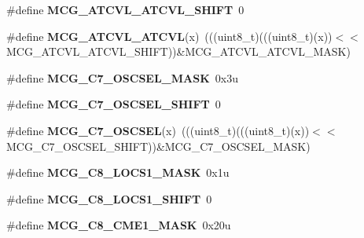 \begin{DoxyCompactItemize}
\item 
\#define {\bfseries M\+C\+G\+\_\+\+A\+T\+C\+V\+L\+\_\+\+A\+T\+C\+V\+L\+\_\+\+S\+H\+I\+FT}~0\hypertarget{group__MCG__Register__Masks_ga9e3e0eab24aaf1bf2905ae0cf4803eb3}{}\label{group__MCG__Register__Masks_ga9e3e0eab24aaf1bf2905ae0cf4803eb3}

\item 
\#define {\bfseries M\+C\+G\+\_\+\+A\+T\+C\+V\+L\+\_\+\+A\+T\+C\+VL}(x)~(((uint8\+\_\+t)(((uint8\+\_\+t)(x))$<$$<$M\+C\+G\+\_\+\+A\+T\+C\+V\+L\+\_\+\+A\+T\+C\+V\+L\+\_\+\+S\+H\+I\+FT))\&M\+C\+G\+\_\+\+A\+T\+C\+V\+L\+\_\+\+A\+T\+C\+V\+L\+\_\+\+M\+A\+SK)\hypertarget{group__MCG__Register__Masks_ga124aa7c8cc26cfd1c06a278add1a0d21}{}\label{group__MCG__Register__Masks_ga124aa7c8cc26cfd1c06a278add1a0d21}

\item 
\#define {\bfseries M\+C\+G\+\_\+\+C7\+\_\+\+O\+S\+C\+S\+E\+L\+\_\+\+M\+A\+SK}~0x3u\hypertarget{group__MCG__Register__Masks_ga8f29d6e2e3ddd8725de2ea86d8f0548f}{}\label{group__MCG__Register__Masks_ga8f29d6e2e3ddd8725de2ea86d8f0548f}

\item 
\#define {\bfseries M\+C\+G\+\_\+\+C7\+\_\+\+O\+S\+C\+S\+E\+L\+\_\+\+S\+H\+I\+FT}~0\hypertarget{group__MCG__Register__Masks_ga36e349718cb5e8af96efea408f059dcb}{}\label{group__MCG__Register__Masks_ga36e349718cb5e8af96efea408f059dcb}

\item 
\#define {\bfseries M\+C\+G\+\_\+\+C7\+\_\+\+O\+S\+C\+S\+EL}(x)~(((uint8\+\_\+t)(((uint8\+\_\+t)(x))$<$$<$M\+C\+G\+\_\+\+C7\+\_\+\+O\+S\+C\+S\+E\+L\+\_\+\+S\+H\+I\+FT))\&M\+C\+G\+\_\+\+C7\+\_\+\+O\+S\+C\+S\+E\+L\+\_\+\+M\+A\+SK)\hypertarget{group__MCG__Register__Masks_gac1a1e06d2189b74b5587b53d3104cb4a}{}\label{group__MCG__Register__Masks_gac1a1e06d2189b74b5587b53d3104cb4a}

\item 
\#define {\bfseries M\+C\+G\+\_\+\+C8\+\_\+\+L\+O\+C\+S1\+\_\+\+M\+A\+SK}~0x1u\hypertarget{group__MCG__Register__Masks_ga1417ca27a647ced3cdfc504a604f8dc8}{}\label{group__MCG__Register__Masks_ga1417ca27a647ced3cdfc504a604f8dc8}

\item 
\#define {\bfseries M\+C\+G\+\_\+\+C8\+\_\+\+L\+O\+C\+S1\+\_\+\+S\+H\+I\+FT}~0\hypertarget{group__MCG__Register__Masks_ga648e426b4d1f976cca5229505a26d9a8}{}\label{group__MCG__Register__Masks_ga648e426b4d1f976cca5229505a26d9a8}

\item 
\#define {\bfseries M\+C\+G\+\_\+\+C8\+\_\+\+C\+M\+E1\+\_\+\+M\+A\+SK}~0x20u\hypertarget{group__MCG__Register__Masks_ga9e0e0db74d7e18fffad7b4f08eb74524}{}\label{group__MCG__Register__Masks_ga9e0e0db74d7e18fffad7b4f08eb74524}


\end{DoxyCompactItemize}
